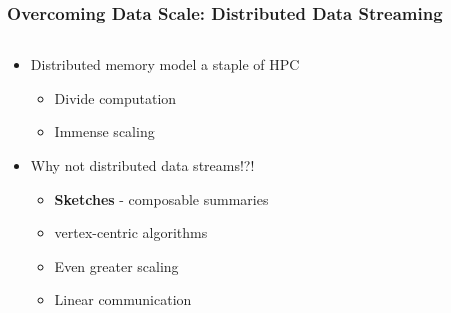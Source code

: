 \documentclass{beamer}
\begin{document}
\begin{frame}
\frametitle{Overcoming Data Scale: Distributed Data Streaming}


\begin{columns}
\begin{column}{0.6\textwidth}
	\begin{itemize}
		\item Distributed memory model a staple of HPC
		\begin{itemize}
			\item Divide computation
			\item Immense scaling
		\end{itemize}
		\item Why not distributed data streams!?!
		\begin{itemize}
			\item \textbf{Sketches} - composable summaries
			\item vertex-centric algorithms
			\item Even greater scaling
			\item Linear communication
		\end{itemize}
	\end{itemize}
\end{column}
\begin{column}{0.4\textwidth}  %
\begin{center}

\end{center}
\end{column}
\end{columns}
\end{frame}
\end{document}
